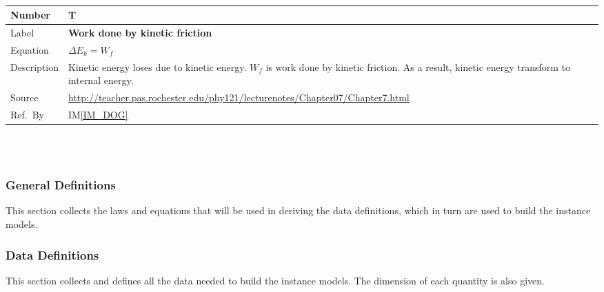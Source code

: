 \documentclass[12pt]{article}
\newcommand{\colAwidth}{0.13\textwidth}
\newcommand{\colBwidth}{0.82\textwidth}
\newcounter{theorynum} %
\newcommand{\iref}[1]{IM\ref{#1}}
\begin{document}
~\newline

\noindent
\begin{minipage}{\textwidth}
	\renewcommand*{\arraystretch}{1.5}
	\begin{tabular}{| p{\colAwidth} | p{\colBwidth}|}
		\hline
		\rowcolor[gray]{0.9}
		Number& T{theorynum}\thetheorynum \label{T_WKF}\\
		\hline
		Label&\bf Work done by kinetic friction\\
		\hline
		Equation&  $\Delta E_{k}=W_{f}$\\
		\hline
		
		Description & 
		Kinetic energy loses due to kinetic energy. $W_{f}$ is work done by kinetic friction. As a result, kinetic energy transform to internal energy.\\
		\hline
		Source &
		\url{http://teacher.pas.rochester.edu/phy121/lecturenotes/Chapter07/Chapter7.html}\\
		\hline
		Ref.\ By & \iref{IM_DOG}\\
		\hline
	\end{tabular}
\end{minipage}\\

~\newline

\subsubsection{General Definitions}\label{sec_gendef}

This section collects the laws and equations that will be used in deriving the
data definitions, which in turn are used to build the instance models.

\subsubsection{Data Definitions}\label{sec_datadef}

This section collects and defines all the data needed to build the instance
models. The dimension of each quantity is also given. 

~\newline
\end{document}
